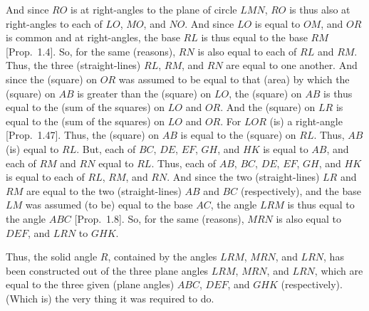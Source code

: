 \begin{Parallel}{}{}
{And since $RO$ is at right-angles to the plane of circle $LMN$, $RO$
is thus also at right-angles to each of $LO$, $MO$, and $NO$. And since
$LO$ is equal to $OM$, and $OR$ is common and at right-angles,
the base $RL$ is thus equal to the base $RM$ [Prop.~1.4]. So, for the same (reasons), $RN$ is also equal to
each of $RL$ and $RM$. Thus, the three (straight-lines) $RL$, $RM$,
and $RN$ are equal to one another. And since the (square) on $OR$
was assumed to be equal to that (area) by which the (square) on $AB$
is greater than the (square) on $LO$, the (square) on $AB$ is thus equal
to the (sum of the squares) on $LO$ and $OR$. And the (square) on 
$LR$ is equal to the (sum of the squares) on $LO$ and $OR$. For $LOR$ (is) a right-angle  [Prop.~1.47]. Thus,
the (square) on $AB$ is equal to the (square) on $RL$. Thus, $AB$ (is)
equal to $RL$. But, each of $BC$, $DE$, $EF$, $GH$, and $HK$
is equal to $AB$, and each of $RM$ and $RN$ equal to $RL$. Thus,
each of $AB$, $BC$, $DE$, $EF$, $GH$, and $HK$ is equal to each of
$RL$, $RM$, and $RN$. And since the two (straight-lines)
$LR$ and $RM$ are equal to the two (straight-lines) $AB$ and $BC$ (respectively), and the base $LM$ was assumed (to be) equal to the
base $AC$, the angle $LRM$ is thus equal to the angle $ABC$
[Prop.~1.8]. So, for the same (reasons), $MRN$
is also equal to $DEF$, and $LRN$ to $GHK$.

Thus, the solid angle $R$, contained by the angles $LRM$, $MRN$, and $LRN$,  has been constructed out of the three plane
angles $LRM$, $MRN$, and $LRN$, which are equal to the three
given (plane angles) $ABC$, $DEF$, and $GHK$ (respectively). 
(Which is) the very thing it was required to do.}
\end{Parallel}

